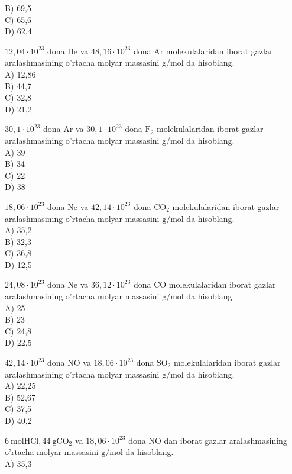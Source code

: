 B) 69,5\\
C) 65,6\\
D) 62,4
  \item $12,04 \cdot 10^{23}$ dona He va $48,16 \cdot 10^{23}$ dona Ar molekulalaridan iborat gazlar aralashmasining o'rtacha molyar massasini g/mol da hisoblang.\\
A) 12,86\\
B) 44,7\\
C) 32,8\\
D) 21,2
  \item $30,1 \cdot 10^{23}$ dona Ar va $30,1 \cdot 10^{23}$ dona $\mathrm{F}_{2}$ molekulalaridan iborat gazlar aralashmasining o'rtacha molyar massasini g/mol da hisoblang.\\
A) 39\\
B) 34\\
C) 22\\
D) 38
  \item $18,06 \cdot 10^{23}$ dona Ne va $42,14 \cdot 10^{23}$ dona $\mathrm{CO}_{2}$ molekulalaridan iborat gazlar aralashmasining o'rtacha molyar massasini $\mathrm{g} / \mathrm{mol}$ da hisoblang.\\
A) 35,2\\
B) 32,3\\
C) 36,8\\
D) 12,5
  \item $24,08 \cdot 10^{23}$ dona Ne va $36,12 \cdot 10^{23}$ dona CO molekulalaridan iborat gazlar aralashmasining o'rtacha molyar massasini $\mathrm{g} / \mathrm{mol}$ da hisoblang.\\
A) 25\\
B) 23\\
C) 24,8\\
D) 22,5
  \item $42,14 \cdot 10^{23}$ dona NO va $18,06 \cdot 10^{23}$ dona $\mathrm{SO}_{2}$ molekulalaridan iborat gazlar\\
aralashmasining o'rtacha molyar massasini $\mathrm{g} / \mathrm{mol}$ da hisoblang.\\
A) 22,25\\
B) 52,67\\
C) 37,5\\
D) 40,2
  \item $6 \mathrm{~mol} \mathrm{HCl}, 44 \mathrm{~g} \mathrm{CO}_{2}$ va $18,06 \cdot 10^{23}$ dona NO dan iborat gazlar aralashmasining o'rtacha molyar massasini $\mathrm{g} / \mathrm{mol}$ da hisoblang.\\
A) 35,3\\
